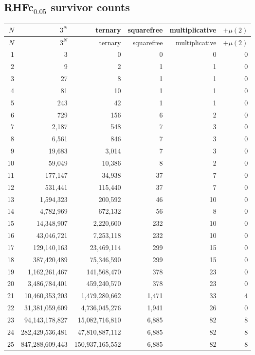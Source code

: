 \documentclass[11pt]{article}
\begin{document}
\subsection{RHFc$_{0.05}$ survivor counts}
\begin{center}\scriptsize\begin{longtable}{r r r r r r}
\toprule $N$ & $3^N$ & ternary & squarefree & multiplicative & $+\mu(2)$\\ \midrule\endfirsthead
\toprule $N$ & $3^N$ & ternary & squarefree & multiplicative & $+\mu(2)$\\ \midrule\endhead
1 & 3 & 0 & 0 & 0 & 0\\
2 & 9 & 2 & 1 & 1 & 0\\
3 & 27 & 8 & 1 & 1 & 0\\
4 & 81 & 10 & 1 & 1 & 0\\
5 & 243 & 42 & 1 & 1 & 0\\
6 & 729 & 156 & 6 & 2 & 0\\
7 & 2{,}187 & 548 & 7 & 3 & 0\\
8 & 6{,}561 & 846 & 7 & 3 & 0\\
9 & 19{,}683 & 3{,}014 & 7 & 3 & 0\\
10 & 59{,}049 & 10{,}386 & 8 & 2 & 0\\
11 & 177{,}147 & 34{,}938 & 37 & 7 & 0\\
12 & 531{,}441 & 115{,}440 & 37 & 7 & 0\\
13 & 1{,}594{,}323 & 200{,}592 & 46 & 10 & 0\\
14 & 4{,}782{,}969 & 672{,}132 & 56 & 8 & 0\\
15 & 14{,}348{,}907 & 2{,}220{,}600 & 232 & 10 & 0\\
16 & 43{,}046{,}721 & 7{,}253{,}118 & 232 & 10 & 0\\
17 & 129{,}140{,}163 & 23{,}469{,}114 & 299 & 15 & 0\\
18 & 387{,}420{,}489 & 75{,}346{,}590 & 299 & 15 & 0\\
19 & 1{,}162{,}261{,}467 & 141{,}568{,}470 & 378 & 23 & 0\\
20 & 3{,}486{,}784{,}401 & 459{,}240{,}570 & 378 & 23 & 0\\
21 & 10{,}460{,}353{,}203 & 1{,}479{,}280{,}662 & 1{,}471 & 33 & 4\\
22 & 31{,}381{,}059{,}609 & 4{,}736{,}045{,}276 & 1{,}941 & 26 & 0\\
23 & 94{,}143{,}178{,}827 & 15{,}082{,}716{,}810 & 6{,}885 & 82 & 8\\
24 & 282{,}429{,}536{,}481 & 47{,}810{,}887{,}112 & 6{,}885 & 82 & 8\\
25 & 847{,}288{,}609{,}443 & 150{,}937{,}165{,}552 & 6{,}885 & 82 & 8\\
\bottomrule\end{longtable}\end{center}
\end{document}
